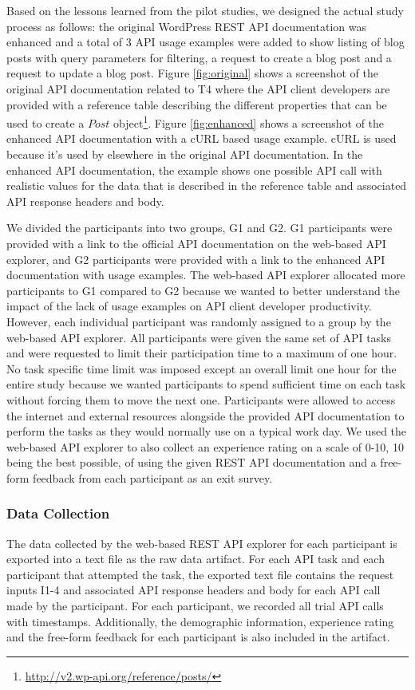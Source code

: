 \documentclass[conference]{IEEEtran}
\begin{document}
Based on the lessons learned from the pilot studies, we designed the actual study process as follows: the original WordPress REST API documentation was enhanced and a total of 3 API usage examples were added to show listing of blog posts with query parameters for filtering, a request to create a blog post and a request to update a blog post. Figure \ref{fig:original} shows a screenshot of the original API documentation related to T4 where the API client developers are provided with a reference table describing the different properties that can be used to create a $Post$ object\footnote{\url{http://v2.wp-api.org/reference/posts/}}. Figure \ref{fig:enhanced} shows a screenshot of the enhanced API documentation with a cURL based usage example. cURL is used because it's used by elsewhere in the original API documentation. In the enhanced API documentation, the example shows one possible API call with realistic values for the data that is described in the reference table and associated API response headers and body.

We divided the participants into two groups, G1 and G2. G1 participants were provided with a link to the official API documentation on the web-based API explorer, and G2 participants were provided with a link to the enhanced API documentation with usage examples. The web-based API explorer allocated more participants to G1 compared to G2 because we wanted to better understand the impact of the lack of usage examples on API client developer productivity. However, each individual participant was randomly assigned to a group by the web-based API explorer. All participants were given the same set of API tasks and were requested to limit their participation time to a maximum of one hour. No task specific time limit was imposed except an overall limit one hour for the entire study because we wanted participants to spend sufficient time on each task without forcing them to move the next one. Participants were allowed to access the internet and external resources alongside the provided API documentation to perform the tasks as they would normally use on a typical work day. We used the web-based API explorer to also collect an experience rating on a scale of 0-10, 10 being the best possible, of using the given REST API documentation and a free-form feedback from each participant as an exit survey.

\subsubsection{Data Collection} %
The data collected by the web-based REST API explorer for each participant is exported into a text file as the raw data artifact. For each API task and each participant that attempted the task, the exported text file contains the request inputs I1-4 and associated API response headers and body for each API call made by the participant. For each participant, we recorded all trial API calls with timestamps. Additionally, the demographic information, experience rating and the free-form feedback for each participant is also included in the artifact.
\end{document}
